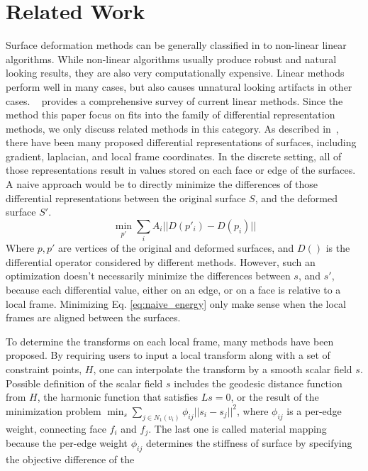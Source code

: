 \documentclass{6838publ}
\begin{document}
\section{Related Work} \label{sec:related_work} Surface deformation
methods can be generally classified in to non-linear linear
algorithms. While non-linear algorithms usually produce robust and
natural looking results, they are also very computationally
expensive. Linear methods perform well in many cases, but also causes
unnatural looking artifacts in other cases.  ~\cite{botsch2008linear}
provides a comprehensive survey of current linear methods. Since the
method this paper focus on fits into the family of differential
representation methods, we only discuss related methods in this
category. As described in~\cite{botsch2008linear}, there have been
many proposed differential representations of surfaces, including
gradient, laplacian, and local frame coordinates. In the discrete
setting, all of those representations result in values stored on each
face or edge of the surfaces. A naive approach would be to directly
minimize the differences of those differential representations between
the original surface $S$, and the deformed surface $S'$.
\begin{equation} \label{eq:naive_energy} \min_{p'} \sum_{i} A_{i} ||
D(p'_{i}) - D(p_{i})||
\end{equation} Where $p, p'$ are vertices of the original and deformed
surfaces, and $D()$ is the differential operator considered by
different methods.  However, such an optimization doesn't necessarily
minimize the differences between $s$, and $s'$, because each
differential value, either on an edge, or on a face is relative to a
local frame. Minimizing Eq. \ref{eq:naive_energy} only make sense when
the local frames are aligned between the surfaces.
\par To determine the transforms on each local frame, many methods
have been proposed. By requiring users to input a local transform
along with a set of constraint points, $H$, one can interpolate the
transform by a smooth scalar field $s$. Possible definition of the
scalar field $s$ includes the geodesic distance function from $H$, the
harmonic function that satisfies $Ls = 0$, or the result of the
minimization problem $\min_{s} \sum_{j\in N_{1}(v_{i})} \phi_{ij}
||s_{i} - s_{j}||^2$, where $\phi_{ij}$ is a per-edge weight,
connecting face $f_i$ and $f_j$. The last one is called material
mapping because the per-edge weight $\phi_{ij}$ determines the
stiffness of surface by specifying the objective difference of the
\end{document}
